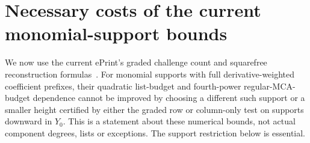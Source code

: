 \section{Necessary costs of the current monomial-support bounds}
\label{sec:current-graded}

We now use the current ePrint's graded challenge count and squarefree
reconstruction formulas~\cite[Equations (54)--(58), (60), (63)--(64)]{DKTcurrent}.
For monomial supports with full derivative-weighted coefficient prefixes,
their
quadratic list-budget and fourth-power regular-MCA-budget dependence
cannot be improved by choosing a different such support or a smaller
height certified by either the graded row or column-only test on supports
downward in $Y_0$. This is a statement about
these numerical bounds, not actual component degrees, lists or exceptions.
The support restriction below is essential.

